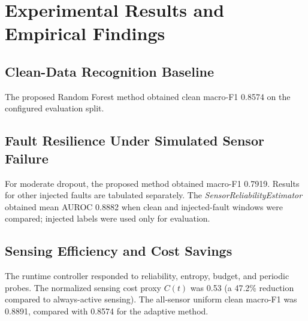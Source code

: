 \section{Experimental Results and Empirical Findings}
\label{sec:results}

\subsection{Clean-Data Recognition Baseline}
The proposed Random Forest method obtained clean macro-F1 0.8574 on the configured evaluation split.

\subsection{Fault Resilience Under Simulated Sensor Failure}
For moderate dropout, the proposed method obtained macro-F1 0.7919. Results for other injected faults are tabulated separately.
The \textit{SensorReliabilityEstimator} obtained mean AUROC 0.8882 when clean and injected-fault windows were compared; injected labels were used only for evaluation.

\subsection{Sensing Efficiency and Cost Savings}
The runtime controller responded to reliability, entropy, budget, and periodic probes.
The normalized sensing cost proxy $C(t)$ was 0.53 (a 47.2\% reduction compared to always-active sensing). The all-sensor uniform clean macro-F1 was 0.8891, compared with 0.8574 for the adaptive method.
